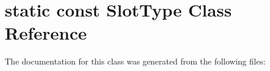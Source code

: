 \hypertarget{classstatic_01const_01SlotType}{}\section{static const Slot\+Type Class Reference}
\label{classstatic_01const_01SlotType}


The documentation for this class was generated from the following files\+: